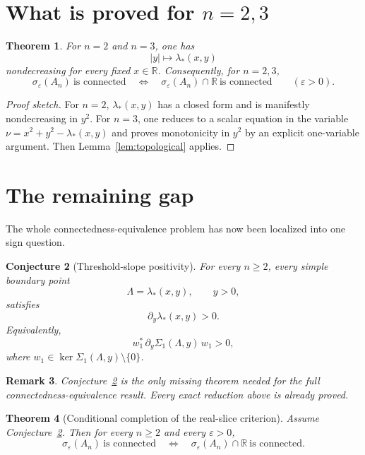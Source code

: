 \documentclass[11pt]{article}
\newtheorem{theorem}{Theorem}[section]
\newtheorem{remark}[theorem]{Remark}
\newtheorem{conjecture}[theorem]{Conjecture}
\newcommand{\R}{\mathbb R}
\newcommand{\eps}{\varepsilon}
\begin{document}
\section{What is proved for \(n=2,3\)}

\begin{theorem}\label{thm:n23}
For \(n=2\) and \(n=3\), one has
\[
|y|\longmapsto \lambda_*(x,y)
\]
nondecreasing for every fixed \(x\in\R\). Consequently, for \(n=2,3\),
\[
\sigma_\eps(A_n)\ \text{is connected}
\quad\Longleftrightarrow\quad
\sigma_\eps(A_n)\cap\R\ \text{is connected}
\qquad (\eps>0).
\]
\end{theorem}

\begin{proof}[Proof sketch]
For \(n=2\), \(\lambda_*(x,y)\) has a closed form and is manifestly nondecreasing in \(y^2\).
For \(n=3\), one reduces to a scalar equation in the variable \(\nu=x^2+y^2-\lambda_*(x,y)\)
and proves monotonicity in \(y^2\) by an explicit one-variable argument. Then
Lemma~\ref{lem:topological} applies.
\end{proof}

\section{The remaining gap}

The whole connectedness-equivalence problem has now been localized into one sign question.

\begin{conjecture}[Threshold-slope positivity]\label{conj:threshold}
For every \(n\ge 2\), every simple boundary point
\[
\Lambda=\lambda_*(x,y),
\qquad y>0,
\]
satisfies
\[
\partial_y \lambda_*(x,y)>0.
\]
Equivalently,
\[
w_1^*\,\partial_y\Sigma_1(\Lambda,y)\,w_1>0,
\]
where \(w_1\in\ker\Sigma_1(\Lambda,y)\setminus\{0\}\).
\end{conjecture}

\begin{remark}
Conjecture~\ref{conj:threshold} is the only missing theorem needed for the full
connectedness-equivalence result. Every exact reduction above is already proved.
\end{remark}

\begin{theorem}[Conditional completion of the real-slice criterion]
\label{thm:conditional}
Assume Conjecture~\ref{conj:threshold}. Then for every \(n\ge 2\) and every \(\eps>0\),
\[
\sigma_\eps(A_n)\ \text{is connected}
\quad\Longleftrightarrow\quad
\sigma_\eps(A_n)\cap\R\ \text{is connected}.
\]
\end{theorem}
\end{document}
